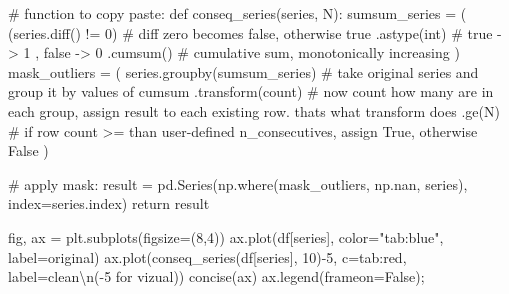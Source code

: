 \documentclass[
  letterpaper,
  DIV=11,
  numbers=noendperiod,
  oneside]{scrreprt}
\newenvironment{Shaded}{\begin{snugshade}}{\end{snugshade}}
\newcommand{\CharTok}[1]{\textcolor[rgb]{0.13,0.47,0.30}{#1}}
\newcommand{\CommentTok}[1]{\textcolor[rgb]{0.37,0.37,0.37}{#1}}
\newcommand{\ControlFlowTok}[1]{\textcolor[rgb]{0.00,0.23,0.31}{#1}}
\newcommand{\DecValTok}[1]{\textcolor[rgb]{0.68,0.00,0.00}{#1}}
\newcommand{\KeywordTok}[1]{\textcolor[rgb]{0.00,0.23,0.31}{#1}}
\newcommand{\NormalTok}[1]{\textcolor[rgb]{0.00,0.23,0.31}{#1}}
\newcommand{\OperatorTok}[1]{\textcolor[rgb]{0.37,0.37,0.37}{#1}}
\newcommand{\StringTok}[1]{\textcolor[rgb]{0.13,0.47,0.30}{#1}}
\newcommand{\VariableTok}[1]{\textcolor[rgb]{0.07,0.07,0.07}{#1}}
\begin{document}
\begin{Shaded}
\begin{Highlighting}[]
\CommentTok{\# function to copy paste:}
\KeywordTok{def}\NormalTok{ conseq\_series(series, N):}
\NormalTok{    sumsum\_series }\OperatorTok{=}\NormalTok{ (}
\NormalTok{                   (series.diff() }\OperatorTok{!=} \DecValTok{0}\NormalTok{)         }\CommentTok{\# diff zero becomes false, otherwise true}
\NormalTok{                      .astype(}\StringTok{\textquotesingle{}int\textquotesingle{}}\NormalTok{)           }\CommentTok{\# true {-}\textgreater{} 1  , false {-}\textgreater{} 0}
\NormalTok{                      .cumsum()                }\CommentTok{\# cumulative sum, monotonically increasing}
\NormalTok{                  )  }
\NormalTok{    mask\_outliers }\OperatorTok{=}\NormalTok{ (}
\NormalTok{                    series.groupby(sumsum\_series)           }\CommentTok{\# take original series and group it by values of cumsum}
\NormalTok{                                .transform(}\StringTok{\textquotesingle{}count\textquotesingle{}}\NormalTok{)        }\CommentTok{\# now count how many are in each group, assign result to each existing row. that\textquotesingle{}s what transform does}
\NormalTok{                                .ge(N)                    }\CommentTok{\# if row count \textgreater{}= than user{-}defined n\_consecutives, assign True, otherwise False}
\NormalTok{                    )}
    
    \CommentTok{\# apply mask:}
\NormalTok{    result }\OperatorTok{=}\NormalTok{ pd.Series(np.where(mask\_outliers, np.nan, series), index}\OperatorTok{=}\NormalTok{series.index)}
    \ControlFlowTok{return}\NormalTok{ result}
\end{Highlighting}
\end{Shaded}

\begin{Shaded}
\begin{Highlighting}[]
\NormalTok{fig, ax }\OperatorTok{=}\NormalTok{ plt.subplots(figsize}\OperatorTok{=}\NormalTok{(}\DecValTok{8}\NormalTok{,}\DecValTok{4}\NormalTok{))}
\NormalTok{ax.plot(df[}\StringTok{\textquotesingle{}series\textquotesingle{}}\NormalTok{], color}\OperatorTok{=}\StringTok{"tab:blue"}\NormalTok{, label}\OperatorTok{=}\StringTok{\textquotesingle{}original\textquotesingle{}}\NormalTok{)}
\NormalTok{ax.plot(conseq\_series(df[}\StringTok{\textquotesingle{}series\textquotesingle{}}\NormalTok{], }\DecValTok{10}\NormalTok{)}\OperatorTok{{-}}\DecValTok{5}\NormalTok{, c}\OperatorTok{=}\StringTok{\textquotesingle{}tab:red\textquotesingle{}}\NormalTok{, label}\OperatorTok{=}\StringTok{\textquotesingle{}clean}\CharTok{\textbackslash{}n}\StringTok{({-}5 for vizual)\textquotesingle{}}\NormalTok{)}
\NormalTok{concise(ax)}
\NormalTok{ax.legend(frameon}\OperatorTok{=}\VariableTok{False}\NormalTok{)}\OperatorTok{;}
\end{Highlighting}
\end{Shaded}
\end{document}
